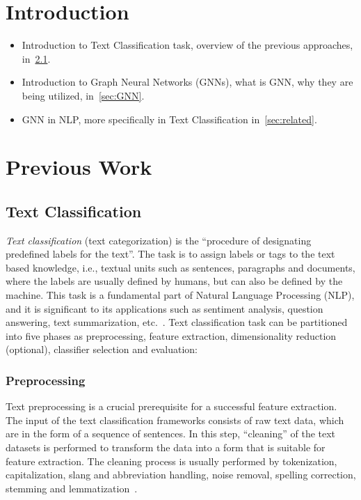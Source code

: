 \section{Introduction}
\begin{itemize}
    \item Introduction to Text Classification task, overview of the previous approaches, in~\cref{sec:TC}.
    \item Introduction to Graph Neural Networks (GNNs), what is GNN, why they are being utilized, in~\cref{sec:GNN}.
    \item GNN in NLP, more specifically in Text Classification in~\cref{sec:related}.
\end{itemize}

\clearpage
\section{Previous Work}
\subsection{Text Classification}\label{sec:TC}
\emph{Text classification} (text categorization) is the ``procedure of designating predefined labels for the text''. The task is to assign labels or tags to the text based knowledge, i.e., textual units such as sentences, paragraphs and documents, where the labels are usually defined by humans, but can also be defined by the machine. This task is a fundamental part of Natural Language Processing (NLP), and it is significant to its applications such as sentiment analysis, question answering, text summarization, etc.~\autocite{li20tc}. Text classification task can be partitioned into five phases as preprocessing, feature extraction, dimensionality reduction (optional), classifier selection and evaluation:

\subsubsection{Preprocessing}
Text preprocessing is a crucial prerequisite for a successful feature extraction. The input of the text classification frameworks consists of raw text data, which are in the form of a sequence of sentences. In this step, ``cleaning'' of the text datasets is performed to transform the data into a form that is suitable for feature extraction. The cleaning process is usually performed by tokenization, capitalization, slang and abbreviation handling, noise removal, spelling correction, stemming and lemmatization~\autocite{kowsari19tc}.

